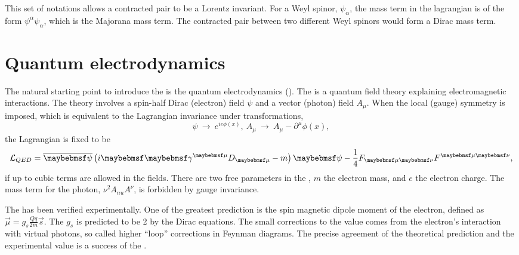 This set of notations allows a contracted pair to be a Lorentz invariant. For a Weyl spinor, $\psi_\alpha$, the mass term in the lagrangian is of the form $\psi^{\alpha}\psi_\alpha$, which is the Majorana mass term. The contracted pair between two different Weyl spinors would form a Dirac mass term.


\section{Quantum electrodynamics}

The natural starting point to introduce the \SM is the quantum electrodynamics (\QED). The \QED is a quantum field theory explaining electromagnetic interactions. The theory involves a spin-half Dirac (electron) field $\psi$ and a vector (photon) field $A_{\mu}$. When the local (gauge) symmetry is imposed, which is equivalent to the Lagrangian invariance under transformations,
\begin{equation}
\psi\ \to\ e^{ie\phi(x)},\ A_{\mu}\ \to\ A_{\mu} - \partial^{\mu}\phi(x),
\end{equation}
the Lagrangian is fixed to be
\begin{equation}
\Lagr_{QED} = \overline{\psi} \left( i\Dstroke - m \right)\psi -  \frac{1}{4}F_{\mu\nu}F^{\mu\nu},
\end{equation}
if up to cubic terms are allowed in the fields. There are two free parameters in the \QED, $m$ the electron mass, and $e$ the electron charge. The mass term for the photon, $\nu^{2}A_{nu}A^{\nu}$, is forbidden by gauge invariance.

The \QED has been verified experimentally. One of the greatest prediction is the spin magnetic dipole moment of the electron, defined as $\vec{\mu} = g_{s}\frac{Qq}{2m} \vec{s}$. The $g_{s}$ is predicted to be 2 by the Dirac equations. The small corrections to the value comes from the electron's interaction with virtual photons, so called higher ``loop'' corrections in Feynman diagrams. The precise agreement of the theoretical prediction and the experimental value is a success of the \QED.

